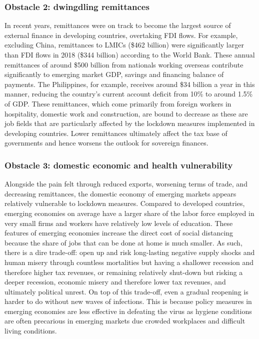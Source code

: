 \documentclass[11pt,]{article}
\begin{document}
\hypertarget{obstacle-2-dwingdling-remittances}{%
\subsubsection{Obstacle 2: dwingdling
remittances}\label{obstacle-2-dwingdling-remittances}}

In recent years, remittances were on track to become the largest source
of external finance in developing countries, overtaking FDI flows. For
example, excluding China, remittances to LMICs (\$462 billion) were
significantly larger than FDI flows in 2018 (\$344 billion) according to
the World Bank. These annual remittances of around \$500 billion from
nationals working overseas contribute significantly to emerging market
GDP, savings and financing balance of payments. The Philippines, for
example, receives around \$34 billion a year in this manner, reducing
the country's current account deficit from 10\% to around 1.5\% of GDP.
These remittances, which come primarily from foreign workers in
hospitality, domestic work and construction, are bound to decrease as
these are job fields that are particularly affected by the lockdown
measures implemented in developing countries. Lower remittances
ultimately affect the tax base of governments and hence worsens the
outlook for sovereign finances.

\hypertarget{obstacle-3-domestic-economic-and-health-vulnerability}{%
\subsubsection{Obstacle 3: domestic economic and health
vulnerability}\label{obstacle-3-domestic-economic-and-health-vulnerability}}

Alongside the pain felt through reduced exports, worsening terms of
trade, and decreasing remittances, the domestic economy of emerging
markets appears relatively vulnerable to lockdown measures. Compared to
developed countries, emerging economies on average have a larger share
of the labor force employed in very small firms and workers have
relatively low levels of education. These features of emerging economies
increase the direct cost of social distancing because the share of jobs
that can be done at home is much smaller. As such, there is a dire
trade-off: open up and risk long-lasting negative supply shocks and
human misery through countless mortalities but having a shallower
recession and therefore higher tax revenues, or remaining relatively
shut-down but risking a deeper recession, economic misery and therefore
lower tax revenues, and ultimately political unrest. On top of this
trade-off, even a gradual reopening is harder to do without new waves of
infections. This is because policy measures in emerging economies are
less effective in defeating the virus as hygiene conditions are often
precarious in emerging markets due crowded workplaces and difficult
living conditions.
\end{document}
